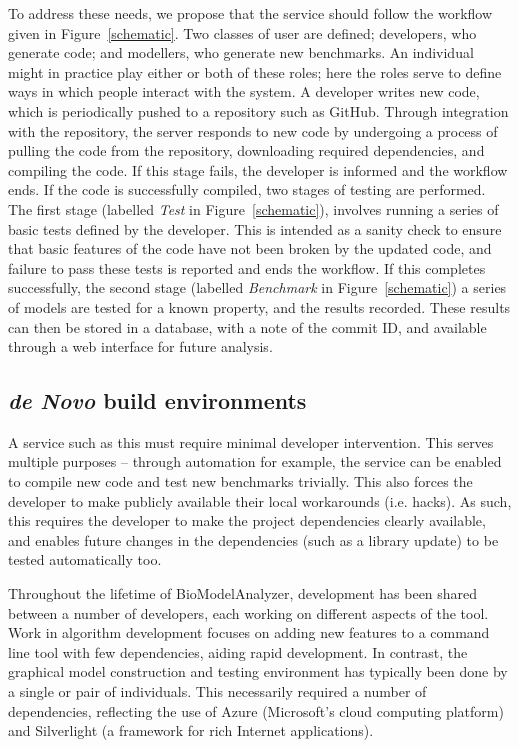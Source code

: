 \documentclass[conference]{IEEEtran}
\begin{document}
To address these needs, we propose that the service should follow the
workflow given in Figure~\ref{schematic}. Two classes of user are
defined; developers, who generate code; and modellers, who generate
new benchmarks. An individual might in practice play either or both of
these roles; here the roles serve to define ways in which people
interact with the system. A developer writes new code, which is
periodically pushed to a repository such as GitHub. Through
integration with the repository, the server responds to new code by
undergoing a process of pulling the code from the repository,
downloading required dependencies, and compiling the code. If this
stage fails, the developer is informed and the workflow ends. If the
code is successfully compiled, two stages of testing are
performed. The first stage (labelled {\emph{Test}} in
Figure~\ref{schematic}), involves running a series of basic tests
defined by the developer. This is intended as a sanity check to ensure
that basic features of the code have not been broken by the updated
code, and failure to pass these tests is reported and ends the
workflow. If this completes successfully, the second stage (labelled
{\emph{Benchmark}} in Figure~\ref{schematic}) a series of models are
tested for a known property, and the results recorded. These results
can then be stored in a database, with a note of the commit ID, and
available through a web interface for future analysis.

\subsection{{\em de Novo} build environments}

A service such as this must require minimal developer intervention.
This serves multiple purposes -- through automation for example, the
service can be enabled to compile new code and test new benchmarks
trivially. This also forces the developer to make publicly available
their local workarounds (i.e. hacks). As such, this requires the
developer to make the project dependencies clearly available, and
enables future changes in the dependencies (such as a library update)
to be tested automatically too.

Throughout the lifetime of BioModelAnalyzer, development has been
shared between a number of developers, each working on different
aspects of the tool. Work in algorithm development focuses on adding
new features to a command line tool with few dependencies, aiding
rapid development. In contrast, the graphical model construction and
testing environment has typically been done by a single or pair of
individuals.  This necessarily required a number of dependencies,
reflecting the use of Azure (Microsoft's cloud computing platform) and
Silverlight (a framework for rich Internet applications).
\end{document}
